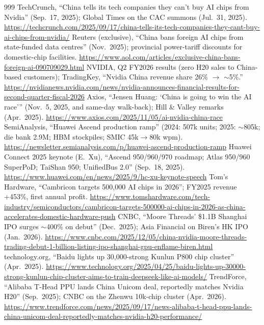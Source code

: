 \begin{thebibliography}{999}
 TechCrunch, ``China tells its tech companies they can't buy AI chips from Nvidia'' (Sep.\ 17, 2025); Global Times on the CAC summons (Jul.\ 31, 2025). \url{https://techcrunch.com/2025/09/17/china-tells-its-tech-companies-they-cant-buy-ai-chips-from-nvidia/}
 Reuters (exclusive), ``China bans foreign AI chips from state-funded data centres'' (Nov.\ 2025); provincial power-tariff discounts for domestic-chip facilities. \url{https://www.aol.com/articles/exclusive-china-bans-foreign-ai-090709029.html}
 NVIDIA, Q2 FY2026 results (zero H20 sales to China-based customers); TradingKey, ``Nvidia China revenue share 26\% $\rightarrow$ $\sim$5\%.'' \url{https://nvidianews.nvidia.com/news/nvidia-announces-financial-results-for-second-quarter-fiscal-2026}
 Axios, ``Jensen Huang: `China is going to win the AI race''' (Nov.\ 5, 2025, and same-day walk-back); Hill \& Valley remarks (Apr.\ 2025). \url{https://www.axios.com/2025/11/05/ai-nvidia-china-race}
 SemiAnalysis, ``Huawei Ascend production ramp'' (2024: 507k units; 2025: $\sim$805k; die bank 2.9M; HBM stockpiles; SMIC 45k$\rightarrow$80k wpm). \url{https://newsletter.semianalysis.com/p/huawei-ascend-production-ramp}
 Huawei Connect 2025 keynote (E.~Xu), ``Ascend 950/960/970 roadmap; Atlas 950/960 SuperPoD; TaiShan 950; UnifiedBus 2.0'' (Sep.\ 18, 2025). \url{https://www.huawei.com/en/news/2025/9/hc-xu-keynote-speech}
 Tom's Hardware, ``Cambricon targets 500,000 AI chips in 2026''; FY2025 revenue +453\%, first annual profit. \url{https://www.tomshardware.com/tech-industry/semiconductors/cambricon-targets-500000-ai-chips-in-2026-as-china-accelerates-domestic-hardware-push}
 CNBC, ``Moore Threads' \$1.1B Shanghai IPO surges $\sim$400\% on debut'' (Dec.\ 2025); Asia Financial on Biren's HK IPO (Jan.\ 2026). \url{https://www.cnbc.com/2025/12/05/china-nvidia-moore-threads-trading-debut-1-billion-listing-ipo-shanghai-gpu-enflame-biren.html}
 technology.org, ``Baidu lights up 30,000-strong Kunlun P800 chip cluster'' (Apr.\ 2025). \url{https://www.technology.org/2025/04/25/baidu-lights-up-30000-strong-kunlun-chip-cluster-aims-to-train-deepseek-like-ai-models/}
 TrendForce, ``Alibaba T-Head PPU lands China Unicom deal, reportedly matches Nvidia H20'' (Sep.\ 2025); CNBC on the Zhenwu 10k-chip cluster (Apr.\ 2026). \url{https://www.trendforce.com/news/2025/09/17/news-alibaba-t-head-ppu-lands-china-unicom-deal-reportedly-matches-nvidia-h20-performance/}

\end{thebibliography}
